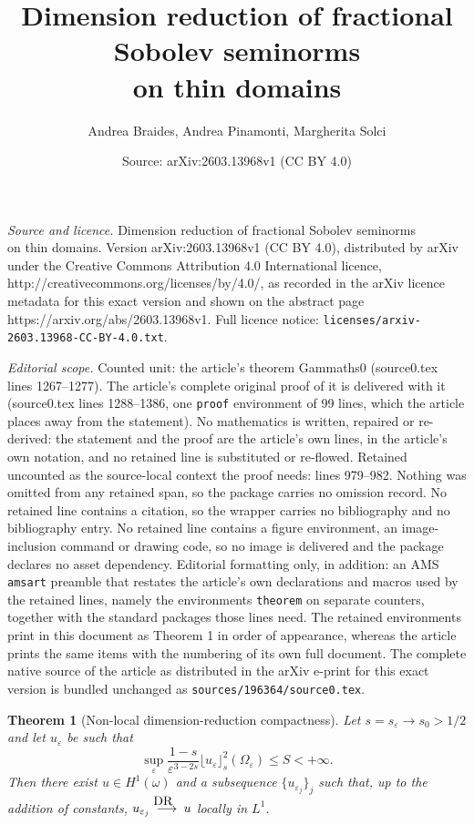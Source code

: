 \documentclass[10pt,a4paper]{amsart}
\title{Dimension reduction of fractional Sobolev seminorms\\ on thin domains}
\author{Andrea Braides, Andrea Pinamonti, Margherita Solci}
\date{Source: arXiv:2603.13968v1 (CC BY 4.0)}
\newtheorem{theorem}{Theorem}
\def\e{\varepsilon}
\begin{document}
\maketitle

\noindent\emph{Source and licence.} Dimension reduction of fractional Sobolev seminorms\\ on thin domains. Version arXiv:2603.13968v1 (CC BY 4.0), distributed by arXiv under the Creative Commons Attribution 4.0 International licence, http://creativecommons.org/licenses/by/4.0/, as recorded in the arXiv licence metadata for this exact version and shown on the abstract page https://arxiv.org/abs/2603.13968v1. Full licence notice: \texttt{licenses/arxiv-2603.13968-CC-BY-4.0.txt}.\par\smallskip

\noindent\textit{Editorial scope.} Counted unit: the article's theorem Gammaths0 (source0.tex lines 1267--1277). The article's complete original proof of it is delivered with it (source0.tex lines 1288--1386, one \texttt{proof} environment of 99 lines, which the article places away from the statement). No mathematics is written, repaired or re-derived: the statement and the proof are the article's own lines, in the article's own notation, and no retained line is substituted or re-flowed.  Retained uncounted as the source-local context the proof needs: lines 979--982.  Nothing was omitted from any retained span, so the package carries no omission record.  No retained line contains a citation, so the wrapper carries no bibliography and no bibliography entry.  No retained line contains a figure environment, an image-inclusion command or drawing code, so no image is delivered and the package declares no asset dependency.  Editorial formatting only, in addition: an AMS \texttt{amsart} preamble that restates the article's own declarations and macros used by the retained lines, namely the environments \texttt{theorem} on separate counters, together with the standard packages those lines need.  The retained environments print in this document as Theorem 1 in order of appearance, whereas the article prints the same items with the numbering of its own full document.  The complete native source of the article as distributed in the arXiv e-print for this exact version is bundled unchanged as \texttt{sources/196364/source0.tex}.
\begin{theorem}[Non-local dimension-reduction compactness]\label{nlcth-1}
Let $s=s_\e\to s_0>1/2$ and let $u_\e$ be such that $$\sup_\e\frac{1-s}{\e^{3-2s}}\lfloor u_\e\rfloor_s^2(\Omega_\e)\le S<+\infty.$$Then there exist $u\in H^1(\omega)$ and a subsequence $\{u_{\e_j}\}_j$ such that, up to the addition of constants, 
$u_{\e_j}\buildrel{\hbox {\rm\scriptsize DR }\, \, }\over{\longrightarrow} u$ locally in $L^1$.
\end{theorem}
\end{document}
